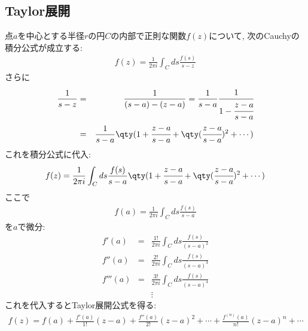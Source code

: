 \documentclass[10.5pt,a4paper]{jreport}
\begin{document}
\subsection{Taylor展開}
点$a$を中心とする半径$r$の円$C$の内部で正則な関数$f(z)$について, 次のCauchyの積分公式が成立する:
\begin{eqnarray}
  f(z) = \frac{1}{2\pi i}\int_C ds \frac{f(s)}{s-z}
\end{eqnarray}
さらに
\begin{eqnarray}
  \frac{1}{s-z} &=& \frac{1}{(s - a) - (z - a)} = \frac{1}{s - a}\cfrac{1}{1 -\cfrac{z - a}{s - a}}\\
  &=& \frac{1}{s - a}\qty(1 + \cfrac{z - a}{s - a} + \qty(\cfrac{z - a}{s - a})^2 + \cdots)
\end{eqnarray}
これを積分公式に代入:
\begin{eqnarray}
  f(z) = \frac{1}{2\pi i}\int_C ds \frac{f(s)}{s - a}\qty(1 + \cfrac{z - a}{s - a} + \qty(\cfrac{z - a}{s - a})^2 + \cdots)
\end{eqnarray}
ここで
\begin{eqnarray}
  f(a) = \frac{1}{2\pi i}\int_C ds \frac{f(s)}{s-a}
\end{eqnarray}
を$a$で微分:
\begin{eqnarray}
  f'(a) &=& \frac{1!}{2\pi i}\int_C ds \frac{f(s)}{(s-a)^2}\\
  f''(a) &=& \frac{2!}{2\pi i}\int_C ds \frac{f(s)}{(s-a)^3}\\
  f'''(a) &=& \frac{3!}{2\pi i}\int_C ds \frac{f(s)}{(s-a)^4}\\
  && \vdots
\end{eqnarray}
これを代入するとTaylor展開公式を得る:
\begin{eqnarray}
  f(z) = f(a) + \frac{f'(a)}{1!}(z-a)+ \frac{f''(a)}{2!}(z-a)^2 + \cdots + \frac{f^{(n)}(a)}{n!}(z-a)^n + \cdots
\end{eqnarray}
\end{document}
